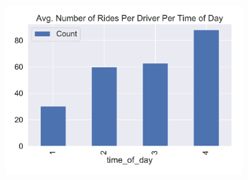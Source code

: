 \documentclass{report}
\begin{document}
\begin{figure}[!htb]
\begin{subfigure}[t]{0.32\textwidth}
					\includegraphics[width=\linewidth]{timefactor_analysis/avg_number_rides_per_timeofdaydriver.pdf}
					\caption{}
				\end{subfigure}\\


\end{figure}
\end{document}
